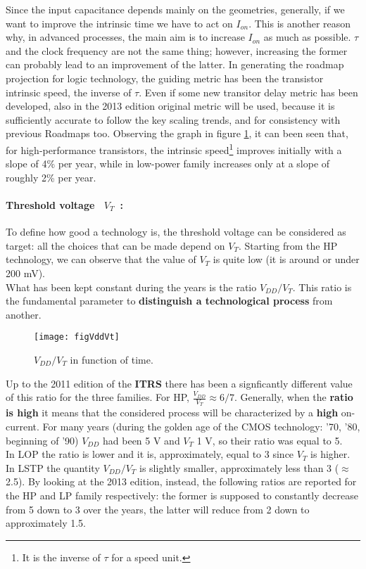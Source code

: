 \documentclass[a4paper, 12pt, twoside, openright]{report}
\begin{document}
Since the input capacitance depends mainly on the geometries, generally, if we want to improve the intrinsic time we have to act on $I_{on}$. This is another reason why, in advanced processes, the main aim is to increase $I_{on}$ as much as possible. $\tau$ and the clock frequency are not the same thing; however, increasing the former can probably lead to an improvement of the latter.
In generating the roadmap projection for logic technology, the guiding metric has been the transistor intrinsic speed, the inverse of $\tau$. Even if some new transitor delay metric has been developed, also in the 2013 edition original metric will be used, because it is sufficiently accurate to follow the key scaling trends, and for consistency with previous Roadmaps too.
Observing the graph in figure \ref{tau}, it can been seen that, for high-performance transistors, the intrinsic speed\footnote{It is the inverse of $\tau$ for a speed unit.} improves initially with a slope of 4\% per year, while in low-power family increases only at a slope of roughly 2\% per year. 


\paragraph{Threshold voltage~  $V_{T}$~:} To define how good a technology is, the threshold voltage can be considered as target: all the choices that can be made depend on $V_{T}$. Starting from the HP technology, we can observe that the value of $V_{T}$ is quite low (it is around or under 200 mV).\\
What has been kept constant during the years is the ratio $V_{DD}/V_{T}$. This ratio is the fundamental parameter to \textbf{distinguish a technological process} from another.

	\begin{figure}[H]
	\centering
	\texttt{[image: figVddVt]}
	\caption{$V_{DD}/V_{T}$ in function of time.}
	\label{tau}
	\end{figure}

Up to the 2011 edition of the \textbf{ITRS} there has been a signficantly different value of this ratio for the three families. For HP, $\frac{V_{DD}}{V_{T}} \approx 6/7$. Generally, when the \textbf{ratio is high} it means that the considered process will be characterized by a \textbf{high} on-current. For many years (during the golden age of the CMOS technology: '70, '80, beginning of '90) $V_{DD}$ had been 5 V and $V_{T}$ 1 V, so their ratio was equal to 5.\\
In LOP the ratio is lower and it is, approximately, equal to 3 since $V_{T}$ is higher.\\
In LSTP the quantity $V_{DD}/V_{T}$ is slightly smaller, approximately less than 3 ($\approx$ 2.5).
By looking at the 2013 edition, instead, the following ratios are reported for the HP and LP family respectively: the former is supposed to constantly decrease from 5 down to 3 over the years, the latter will reduce from 2 down to approximately 1.5. 
\end{document}
